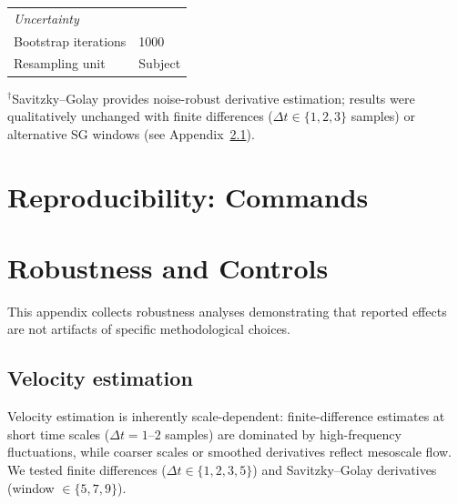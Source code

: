\documentclass[5p,twocolumn,authoryear]{elsarticle}
\begin{document}
\begin{table}[h]
\begin{tabular}{ll}
\midrule
\multicolumn{2}{l}{\emph{Uncertainty}} \\
Bootstrap iterations & 1000 \\
Resampling unit & Subject \\
\bottomrule
\end{tabular}
\begin{flushleft}
\footnotesize{$^\dagger$Savitzky--Golay provides noise-robust derivative estimation; results were qualitatively unchanged with finite differences ($\Delta t \in \{1,2,3\}$ samples) or alternative SG windows (see Appendix~\ref{app:velocity_robustness}).}
\end{flushleft}
\end{table}

\section{Reproducibility: Commands}

\section{Robustness and Controls}
\label{app:robustness}

This appendix collects robustness analyses demonstrating that reported effects are not artifacts of specific methodological choices.

\subsection{Velocity estimation}
\label{app:velocity_robustness}

Velocity estimation is inherently scale-dependent: finite-difference estimates at short time scales ($\Delta t = 1\text{--}2$ samples) are dominated by high-frequency fluctuations, while coarser scales or smoothed derivatives reflect mesoscale flow. We tested finite differences ($\Delta t \in \{1, 2, 3, 5\}$) and Savitzky--Golay derivatives (window $\in \{5, 7, 9\}$).
\end{document}

